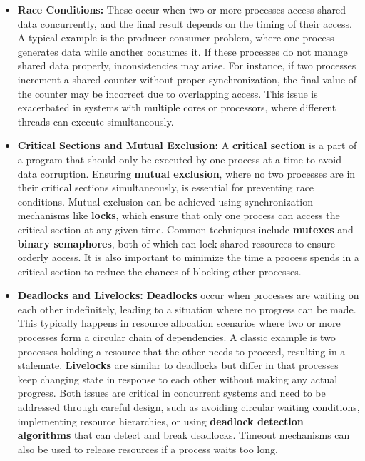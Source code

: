 \documentclass[
  14pt,
  a4paper,
  DIV=11,
  numbers=noendperiod,
  headinclude=true,
  footinclude=true]{scrreprt}
\begin{document}
\begin{itemize}
\item
  \textbf{Race Conditions:} These occur when two or more processes
  access shared data concurrently, and the final result depends on the
  timing of their access. A typical example is the producer-consumer
  problem, where one process generates data while another consumes it.
  If these processes do not manage shared data properly, inconsistencies
  may arise. For instance, if two processes increment a shared counter
  without proper synchronization, the final value of the counter may be
  incorrect due to overlapping access. This issue is exacerbated in
  systems with multiple cores or processors, where different threads can
  execute simultaneously.
\item
  \textbf{Critical Sections and Mutual Exclusion:} A \textbf{critical
  section} is a part of a program that should only be executed by one
  process at a time to avoid data corruption. Ensuring \textbf{mutual
  exclusion}, where no two processes are in their critical sections
  simultaneously, is essential for preventing race conditions. Mutual
  exclusion can be achieved using synchronization mechanisms like
  \textbf{locks}, which ensure that only one process can access the
  critical section at any given time. Common techniques include
  \textbf{mutexes} and \textbf{binary semaphores}, both of which can
  lock shared resources to ensure orderly access. It is also important
  to minimize the time a process spends in a critical section to reduce
  the chances of blocking other processes.
\item
  \textbf{Deadlocks and Livelocks:} \textbf{Deadlocks} occur when
  processes are waiting on each other indefinitely, leading to a
  situation where no progress can be made. This typically happens in
  resource allocation scenarios where two or more processes form a
  circular chain of dependencies. A classic example is two processes
  holding a resource that the other needs to proceed, resulting in a
  stalemate. \textbf{Livelocks} are similar to deadlocks but differ in
  that processes keep changing state in response to each other without
  making any actual progress. Both issues are critical in concurrent
  systems and need to be addressed through careful design, such as
  avoiding circular waiting conditions, implementing resource
  hierarchies, or using \textbf{deadlock detection algorithms} that can
  detect and break deadlocks. Timeout mechanisms can also be used to
  release resources if a process waits too long.
\end{itemize}
\end{document}
